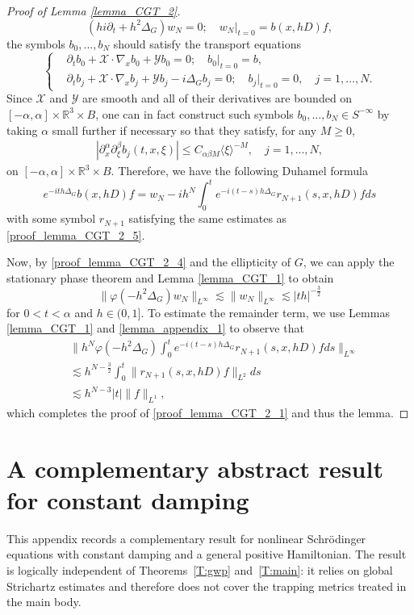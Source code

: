 \documentclass[10pt%
]{amsart}
\numberwithin{equation}{section}
\newcommand{\R}{\mathbb{R}}
\theoremstyle{definition}
\def\<{{\langle}}
\def\>{{\rangle}}
\begin{document}
\begin{proof}[Proof of Lemma \ref{lemma_CGT_2}]
	$$
	(hi\partial_t+h^2\Delta_G)w_N=0;\quad w_N|_{t=0}=b(x,hD)f,
	$$
	the symbols $b_0,...,b_N$ should satisfy the transport equations
	\[
		\left\{\begin{aligned}
			&\partial_t b_0+\mathcal X\cdot\nabla_xb_0+\mathcal Yb_0=0;\quad b_0|_{t=0}=b,\\
			&\partial_t b_j+\mathcal X\cdot\nabla_xb_j+\mathcal Yb_j-i\Delta_Gb_j=0;\quad b_j|_{t=0}=0,\quad j=1,\ldots,N.
		\end{aligned}
		\right.
	\]
	Since $\mathcal X$ and $\mathcal Y$ are smooth and all of their derivatives are bounded on $[-\alpha,\alpha]\times \R^3\times B$, one can in fact construct such symbols $b_0,...,b_N\in S^{-\infty}$ by taking $\alpha$ small further if necessary so that they satisfy, for any $M\ge0$, 
	\begin{align}
		\label{proof_lemma_CGT_2_5}
		|\partial_x^\alpha\partial_\xi^\beta b_j(t,x,\xi)|\le C_{\alpha\beta M}\<\xi\>^{-M},\quad j=1,...,N,
	\end{align}
	on $[-\alpha,\alpha]\times \R^3\times B$. Therefore, we have the following Duhamel formula
	$$
	e^{-ith\Delta_G}b(x,hD)f=w_N-ih^N\int_0^te^{-i(t-s)h\Delta_G}r_{N+1}(s,x,hD)fds
	$$
	with some symbol $r_{N+1}$ satisfying the same estimates as \eqref{proof_lemma_CGT_2_5}. 
	
	Now, by \eqref{proof_lemma_CGT_2_4} and the ellipticity of $G$, we can apply the stationary phase theorem and Lemma \ref{lemma_CGT_1} to obtain
	$$
	\|\varphi(-h^2\Delta_G)w_N\|_{L^\infty}\lesssim \|w_N\|_{L^\infty}\lesssim |th|^{-\frac 32}
	$$
	for $0<t<\alpha$ and $h\in (0,1]$. To estimate the remainder term, we use Lemmas \ref{lemma_CGT_1} and \ref{lemma_appendix_1} to observe that
	\begin{align*}
		&\Big\|h^N\varphi(-h^2\Delta_G)\int_0^te^{-i(t-s)h\Delta_G}r_{N+1}(s,x,hD)fds\Big\|_{L^\infty}\\
		&\lesssim h^{N-\frac32}\int_0^t \|r_{N+1}(s,x,hD)f\|_{L^2}ds\\
		&\lesssim h^{N-3}|t|\|f\|_{L^1},
	\end{align*}
	which completes the proof of \eqref{proof_lemma_CGT_2_1} and thus the lemma. 
\end{proof}
\section{A complementary abstract result for constant damping}\label{appendix:abstract}
	This appendix records a complementary result for nonlinear Schr\"odinger equations with constant damping and a general positive Hamiltonian. The result is logically independent of Theorems~\ref{T:gwp} and~\ref{T:main}: it relies on global Strichartz estimates and therefore does not cover the trapping metrics treated in the main body. 
\end{document}
